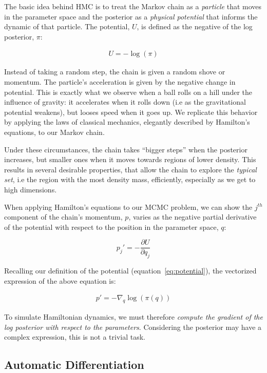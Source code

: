 \documentclass[11pt]{amsart}
\begin{document}
The basic idea behind HMC is to treat the Markov chain as a \textit{particle} that moves in the
parameter space and the posterior as a \textit{physical potential} that informs the dynamic of
that particle. The potential, $U$, is defined as the negative of the log posterior, $\pi$:

\begin{eqnarray}
U = - \log(\pi)
\label{eq:potential}
\end{eqnarray}

Instead of taking a random step, the chain is given a random shove or momentum. The
 particle's acceleration is given by the negative change in potential. This is exactly what 
 we observe when a ball rolls on a hill under the influence of gravity: it accelerates when
  it rolls down (i.e as the gravitational potential weakens), but looses speed when it goes
   up. We replicate this behavior by applying the laws of classical mechanics, elegantly 
   described by Hamilton's equations, to our Markov chain.

Under these circumstances, the chain takes ``bigger steps'' when the posterior increases, 
but smaller ones when it moves towards regions of lower density. This results in several
 desirable properties, that allow the chain to explore the \textit{typical set}, i.e the region 
 with the most density mass, efficiently, especially as we get to high dimensions.

When applying Hamilton's equations to our MCMC problem, we can show the $j^{th}$ 
component of the chain's momentum, $p$, varies as the negative partial derivative of 
the potential with respect to the position in the parameter space, $q$:

$$
p_j' = - \frac{\partial{U}}{\partial{q_j}}
$$

Recalling our definition of the potential (equation~\ref{eq:potential}), the vectorized 
expression of the above equation is:

\begin{eqnarray}
p' = - \nabla_q \log(\pi(q))
\label{eq:gradient}
\end{eqnarray}

To simulate Hamiltonian dynamics, we must therefore \textit{compute the gradient 
of the log posterior with respect to the parameters}. Considering the posterior may have
a complex expression, this is not a trivial task. 

\subsection{Automatic Differentiation} \ \\
\end{document}
